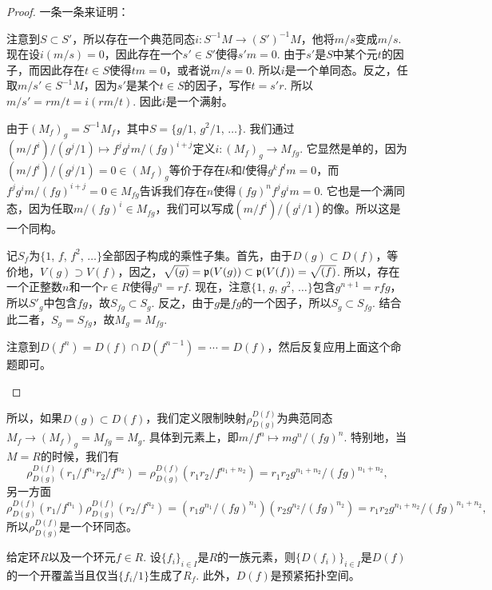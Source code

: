 \begin{proof}
一条一条来证明：
\begin{compactenum}[~~~1.]
\item 注意到$S\subset S'$，所以存在一个典范同态$i:S^{-1}M\to (S')^{-1}M$，他将$m/s$变成$m/s$. 现在设$i(m/s)=0$，因此存在一个$s'\in S'$使得$s'm=0$. 由于$s'$是$S$中某个元$t$的因子，而因此存在$t\in S$使得$tm=0$，或者说$m/s=0$. 所以$i$是一个单同态。反之，任取$m/s'\in S^{-1}M$，因为$s'$是某个$t\in S$的因子，写作$t=s'r$. 所以$m/s'=rm/t=i(rm/t)$. 因此$i$是一个满射。

\item 由于$(M_f)_g=S^{-1}M_f$，其中$S=\{g/1$, $g^2/1$, $\dots\}$. 我们通过$(m/f^i)/(g^j/1)\mapsto f^j g^i m/(fg)^{i+j}$定义$i:(M_f)_g\to M_{fg}$. 它显然是单的，因为$(m/f^i)/(g^j/1)=0\in (M_f)_g$等价于存在$k$和$l$使得$g^kf^l m=0$，而$f^j g^i m/(fg)^{i+j}=0\in M_{fg}$告诉我们存在$n$使得$(fg)^nf^j g^i m=0$. 它也是一个满同态，因为任取$m/(fg)^i\in M_{fg}$，我们可以写成$(m/f^i)/(g^i/1)$的像。所以这是一个同构。

\item 记$S_f$为$\{1$, $f$, $f^{2}$, $\dots\}$全部因子构成的乘性子集。首先，由于$D(g)\subset D(f)$，等价地，$V(g)\supset V(f)$，因之，$\sqrt{(g)}=\mathfrak{p}(V(g))\subset \mathfrak{p}(V(f))=\sqrt{(f)}$. 所以，存在
一个正整数$n$和一个$r\in R$使得$g^n=rf$. 现在，注意$\{1$, $g$, $g^{2}$, $\dots\}$包含$g^{n+1}=rfg$，所以$S'_g$中包含$fg$，故$S_{fg}\subset S_g$. 反之，由于$g$是$fg$的一个因子，所以$S_g\subset S_{fg}$. 结合此二者，$S_g=S_{fg}$，故$M_g=M_{fg}$.

\item 注意到$D(f^n)=D(f)\cap D(f^{n-1})=\cdots=D(f)$，然后反复应用上面这个命题即可。\qedhere
\end{compactenum}
\end{proof}

所以，如果$D(g)\subset D(f)$，我们定义限制映射$\rho^{D(f)}_{D(g)}$为典范同态$M_f\to (M_f)_g=M_{fg}=M_g$. 具体到元素上，即$m/f^n\mapsto mg^n/(fg)^n$. 特别地，当$M=R$的时候，我们有
\[
	\rho^{D(f)}_{D(g)}(r_1/f^{n_1} r_2/f^{n_2})=\rho^{D(f)}_{D(g)}(r_1r_2/f^{n_1+n_2})=r_1r_2 g^{n_1+n_2}/(fg)^{n_1+n_2},
\]
另一方面
\[
	\rho^{D(f)}_{D(g)}(r_1/f^{n_1})\rho^{D(f)}_{D(g)}(r_2/f^{n_2})=(r_1g^{n_1}/(fg)^{n_1})(r_2g^{n_2}/(fg)^{n_2})=r_1r_2 g^{n_1+n_2}/(fg)^{n_1+n_2},
\]
所以$\rho^{D(f)}_{D(g)}$是一个环同态。

\begin{lem}\label{lem:3.12}
给定环$R$以及一个环元$f\in R$. 设$\{f_i\}_{i\in I}$是$R$的一族元素，则$\{D(f_i)\}_{i\in I}$是$D(f)$的一个开覆盖当且仅当$\{f_i/1\}$生成了$R_f$. 此外，$D(f)$是预紧拓扑空间。
\end{lem}

